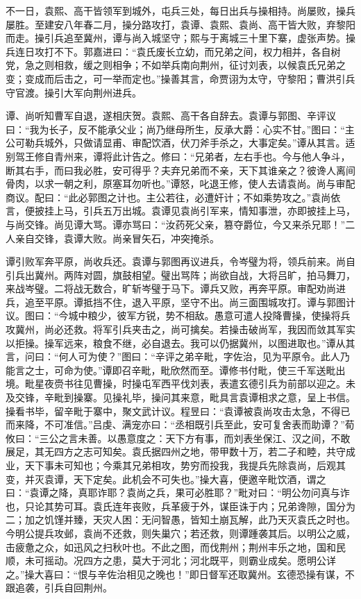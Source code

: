 不一日，袁熙、高干皆领军到城外，屯兵三处，每日出兵与操相持。尚屡败，操兵屡胜。至建安八年春二月，操分路攻打，袁谭、袁熙、袁尚、高干皆大败，弃黎阳而走。操引兵追至冀州，谭与尚入城坚守；熙与于离城三十里下寨，虚张声势。操兵连日攻打不下。郭嘉进曰：“袁氏废长立幼，而兄弟之间，权力相并，各自树党，急之则相救，缓之则相争；不如举兵南向荆州，征讨刘表，以候袁氏兄弟之变；变成而后击之，可一举而定也。”操善其言，命贾诩为太守，守黎阳；曹洪引兵守官渡。操引大军向荆州进兵。

谭、尚听知曹军自退，遂相庆贺。袁熙、高干各自辞去。袁谭与郭图、辛评议曰：“我为长子，反不能承父业；尚乃继母所生，反承大爵：心实不甘。”图曰：“主公可勒兵城外，只做请显甫、审配饮酒，伏刀斧手杀之，大事定矣。”谭从其言。适别驾王修自青州来，谭将此计告之。修曰：“兄弟者，左右手也。今与他人争斗，断其右手，而曰我必胜，安可得乎？夫弃兄弟而不亲，天下其谁亲之？彼谗人离间骨肉，以求一朝之利，原塞耳勿听也。”谭怒，叱退王修，使人去请袁尚。尚与审配商议。配曰：“此必郭图之计也。主公若往，必遭奸计；不如乘势攻之。”袁尚依言，便披挂上马，引兵五万出城。袁谭见袁尚引军来，情知事泄，亦即披挂上马，与尚交锋。尚见谭大骂。谭亦骂曰：“汝药死父亲，篡夺爵位，今又来杀兄耶！”二人亲自交锋，袁谭大败。尚亲冒矢石，冲突掩杀。

谭引败军奔平原，尚收兵还。袁谭与郭图再议进兵，令岑璧为将，领兵前来。尚自引兵出冀州。两阵对圆，旗鼓相望。璧出骂阵；尚欲自战，大将吕旷，拍马舞刀，来战岑璧。二将战无数合，旷斩岑璧于马下。谭兵又败，再奔平原。审配劝尚进兵，追至平原。谭抵挡不住，退入平原，坚守不出。尚三面围城攻打。谭与郭图计议。图曰：“今城中粮少，彼军方锐，势不相敌。愚意可遣人投降曹操，使操将兵攻冀州，尚必还救。将军引兵夹击之，尚可擒矣。若操击破尚军，我因而敛其军实以拒操。操军远来，粮食不继，必自退去。我可以仍据冀州，以图进取也。”谭从其言，问曰：“何人可为使？”图曰：“辛评之弟辛毗，字佐治，见为平原令。此人乃能言之士，可命为使。”谭即召辛毗，毗欣然而至。谭修书付毗，使三千军送毗出境。毗星夜赍书往见曹操，时操屯军西平伐刘表，表遣玄德引兵为前部以迎之。未及交锋，辛毗到操寨。见操礼毕，操问其来意，毗具言袁谭相求之意，呈上书信。操看书毕，留辛毗于寨中，聚文武计议。程昱曰：“袁谭被袁尚攻击太急，不得已而来降，不可准信。”吕虔、满宠亦曰：“丞相既引兵至此，安可复舍表而助谭？”荀攸曰：“三公之言未善。以愚意度之：天下方有事，而刘表坐保江、汉之间，不敢展足，其无四方之志可知矣。袁氏据四州之地，带甲数十万，若二子和睦，共守成业，天下事未可知也；今乘其兄弟相攻，势穷而投我，我提兵先除袁尚，后观其变，并灭袁谭，天下定矣。此机会不可失也。”操大喜，便邀辛毗饮酒，谓之曰：“袁谭之降，真耶诈耶？袁尚之兵，果可必胜耶？”毗对曰：“明公勿问真与诈也，只论其势可耳。袁氏连年丧败，兵革疲于外，谋臣诛于内；兄弟谗隙，国分为二；加之饥馑并臻，天灾人困：无问智愚，皆知土崩瓦解，此乃天灭袁氏之时也。今明公提兵攻邺，袁尚不还救，则失巢穴；若还救，则谭踵袭其后。以明公之威，击疲惫之众，如迅风之扫秋叶也。不此之图，而伐荆州；荆州丰乐之地，国和民顺，未可摇动。况四方之患，莫大于河北；河北既平，则霸业成矣。愿明公详之。”操大喜曰：“恨与辛佐治相见之晚也！”即日督军还取冀州。玄德恐操有谋，不跟追袭，引兵自回荆州。

